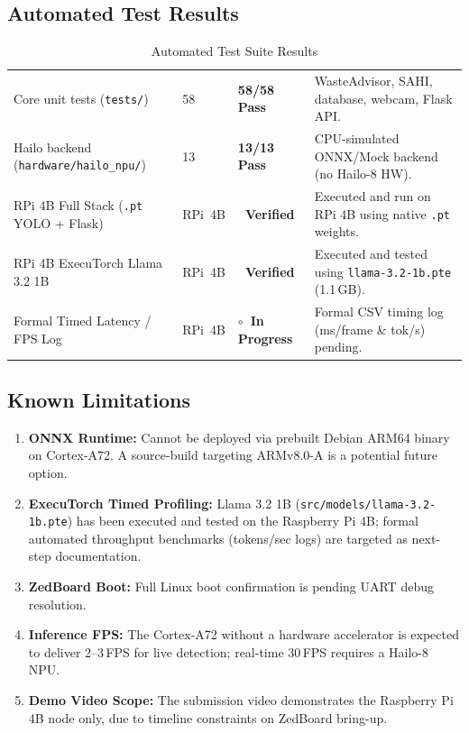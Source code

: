 \documentclass[12pt,a4paper]{article}
\newcommand{\verified}{{\color{statusgreen}\textbf{\checkmark~Verified}}}
\newcommand{\inprogress}{{\color{statusamber}\textbf{$\circ$~In Progress}}}
\begin{document}
\subsection{Automated Test Results}

\renewcommand{\arraystretch}{1.30}
\begin{table}[H]
\centering
\caption{Automated Test Suite Results}
\label{tab:tests}
\small
\begin{tabularx}{\linewidth}{@{} L{4.6cm} C{1.5cm} C{2.8cm} X @{}}
\toprule
{} &  &  &  \\
\midrule
{}
Core unit tests (\texttt{tests/})
  & 58 & \textcolor{statusgreen}{\textbf{58/58 Pass}}
  & WasteAdvisor, SAHI, database, webcam, Flask API. \\
Hailo backend (\texttt{hardware/hailo\_npu/})
  & 13 & \textcolor{statusgreen}{\textbf{13/13 Pass}}
  & CPU-simulated ONNX/Mock backend (no Hailo-8 HW). \\
RPi 4B Full Stack (\texttt{.pt} YOLO + Flask)
  & RPi~4B & \verified
  & Executed and run on RPi 4B using native \texttt{.pt} weights. \\
RPi 4B ExecuTorch Llama 3.2 1B
  & RPi~4B & \verified
  & Executed and tested using \texttt{llama-3.2-1b.pte} (1.1\,GB). \\
Formal Timed Latency / FPS Log
  & RPi~4B & \inprogress{}
  & Formal CSV timing log (ms/frame \& tok/s) pending. \\
\bottomrule
\end{tabularx}
\end{table}

\subsection{Known Limitations}

\begin{enumerate}[label=\textbf{L\arabic*.}]
  \item \textbf{ONNX Runtime:} Cannot be deployed via prebuilt Debian ARM64 binary on
  Cortex-A72. A source-build targeting ARMv8.0-A is a potential future option.
  \item \textbf{ExecuTorch Timed Profiling:} Llama 3.2 1B (\texttt{src/models/llama-3.2-1b.pte})
  has been executed and tested on the Raspberry Pi 4B; formal automated throughput benchmarks
  (tokens/sec logs) are targeted as next-step documentation.
  \item \textbf{ZedBoard Boot:} Full Linux boot confirmation is pending UART debug resolution.
  \item \textbf{Inference FPS:} The Cortex-A72 without a hardware accelerator is expected to
  deliver 2--3\,FPS for live detection; real-time 30\,FPS requires a Hailo-8 NPU.
  \item \textbf{Demo Video Scope:} The submission video demonstrates the Raspberry Pi 4B
  node only, due to timeline constraints on ZedBoard bring-up.
\end{enumerate}
\end{document}
